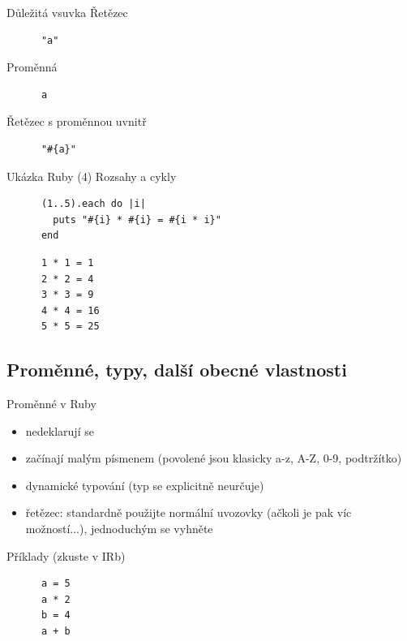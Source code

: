 \documentclass{beamer}
\begin{document}
\begin{frame}[fragile]{Důležitá vsuvka}
  Řetězec
  \begin{block}{}
    \smallskip \footnotesize
    {\scriptsize \begin{verbatim}
      "a"
    \end{verbatim}}
  \end{block}
  \pause
  Proměnná
  \begin{block}{}
    \smallskip \footnotesize
    {\scriptsize \begin{verbatim}
      a
    \end{verbatim}}
  \end{block}
  \pause
  Řetězec s proměnnou uvnitř
  \begin{block}{}
    \smallskip \footnotesize
    {\scriptsize \begin{verbatim}
      "#{a}"
    \end{verbatim}}
  \end{block}
\end{frame}

\begin{frame}[fragile]{Ukázka Ruby (4)}
  Rozsahy a cykly
  \begin{block}{}
    \smallskip \footnotesize
    {\scriptsize \begin{verbatim}
      (1..5).each do |i|
        puts "#{i} * #{i} = #{i * i}"
      end
    \end{verbatim}}
  \end{block}
  \pause
  \begin{block}{}
    \smallskip \footnotesize
    {\scriptsize \begin{verbatim}
      1 * 1 = 1
      2 * 2 = 4
      3 * 3 = 9
      4 * 4 = 16
      5 * 5 = 25
    \end{verbatim}}
  \end{block}
\end{frame}

\subsection{Proměnné, typy, další obecné vlastnosti}

\begin{frame}[fragile]{Proměnné v Ruby}
  \begin{itemize}
    \item nedeklarují se
    \item začínají malým písmenem (povolené jsou klasicky a-z, A-Z, 0-9, podtržítko)
    \item dynamické typování (typ se explicitně neurčuje)
    \item řetězec: standardně použijte normální uvozovky (ačkoli je pak víc možností...), jednoduchým se vyhněte
  \end{itemize}
  \begin{block}{Příklady (zkuste v IRb)}
    \begin{verbatim}
      a = 5
      a * 2
      b = 4
      a + b
    \end{verbatim}
  \end{block}
\end{frame}
\end{document}
